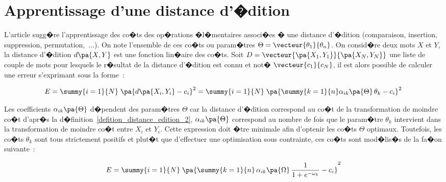 \section{Apprentissage d'une distance d'�dition}
\label{distance_edition_apprentissage_coef_par}

L'article  sugg�re l'apprentissage des co�ts des op�rations �l�mentaires associ�es � une distance d'�dition (comparaison, insertion, suppression, permutation,~...). On note l'ensemble de ces co�ts ou param�tres $\Theta = \vecteur{\theta_1}{\theta_n}$. On consid�re deux mots $X$ et $Y$, la distance d'�dition $d\pa{X,Y}$ est une fonction lin�aire des co�ts. Soit $D = \vecteur{\pa{X_1,Y_1}}{\pa{X_N,Y_N}}$ une liste de couple de mots pour lesquels le r�sultat de la distance d'�dition est connu et not� $\vecteur{c_1}{c_N}$, il est alors possible de calculer une erreur s'exprimant sous la forme~: 

			\begin{eqnarray}
			E = \summy{i=1}{N} \; \pa{d\pa{X_i,Y_i} - c_i}^2 =\summy{i=1}{N} \; 
						\pa{ \summy{k=1}{n} \alpha_{ik}\pa{\Theta} \, \theta_k - c_i}^2 \\
			\end{eqnarray}			

Les coefficients $\alpha_{ik}\pa{\Theta}$ d�pendent des param�tres $\Theta$ car la distance d'�dition correspond au co�t de la transformation de moindre co�t d'apr�s la d�finition~\ref{defition_distance_edition_2}, $\alpha_{ik}\pa{\Theta}$ correspond au nombre de fois que le param�tre $\theta_k$ intervient dans la transformation de moindre co�t entre $X_i$ et $Y_i$. Cette expression doit �tre minimale afin d'optenir les co�ts $\Theta$ optimaux. Toutefois, les co�ts $\theta_k$ sont tous strictement positifs et plut�t que d'effectuer une optimisation sous contrainte, ces co�ts sont mod�lis�s de la fa�on suivante~:

			\begin{eqnarray}
			E = \summy{i=1}{N} \; \pa{ \summy{k=1}{n} \, \alpha_{ik}\pa{\Omega} \, \frac{1}{1 + e^{-\omega_k}} - c_i}^2
			\label{edit_distance_eq_2_app}
			\end{eqnarray}			


